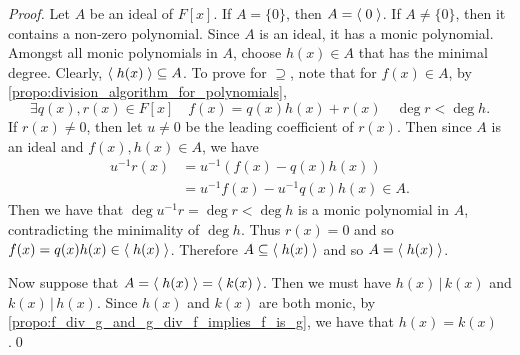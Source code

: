 \begin{proof}
  Let $A$ be an ideal of $F[x]$. If $A = \{0\}$, then $A = \langle \; 0 \; \rangle$. If $A \neq \{0\}$, then it contains a non-zero polynomial. Since $A$ is an ideal, it has a monic polynomial. Amongst all monic polynomials in $A$, choose $h(x) \in A$ that has the minimal degree. Clearly, $\langle \; h(x) \; \rangle \subseteq A$. To prove for $\supseteq$, note that for $f(x) \in A$, by \cref{propo:division_algorithm_for_polynomials},
  \begin{equation*}
    \exists q(x), r(x) \in F[x] \quad f(x) = q(x) h(x) + r(x) \quad \deg r < \deg h.
  \end{equation*}
  If $r(x) \neq 0$, then let $u \neq 0$ be the leading coefficient of $r(x)$. Then since $A$ is an ideal and $f(x), h(x) \in A$, we have
  \begin{align*}
    u^{-1} r(x) &= u^{-1}\left( f(x) - q(x) h(x) \right) \\
                &= u^{-1} f(x) - u^{-1} q(x) h(x) \in A.
  \end{align*}
  Then we have that $\deg u^{-1} r = \deg r < \deg h$ is a monic polynomial in $A$, contradicting the minimality of $\deg h$. Thus $r(x) = 0$ and so $f(x) = q(x) h(x) \in \langle \; h(x) \; \rangle$. Therefore $A \subseteq \langle \; h(x) \; \rangle$ and so $A = \langle \; h(x) \; \rangle$.

  Now suppose that $A = \langle \; h(x) \; \rangle = \langle \; k(x) \; \rangle$. Then we must have $h(x) \, | \, k(x)$ and $k(x) \, | \, h(x)$. Since $h(x)$ and $k(x)$ are both monic, by \cref{propo:f_div_g_and_g_div_f_implies_f_is_g}, we have that $h(x) = k(x)$.\qed
\end{proof}



